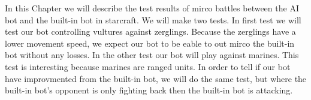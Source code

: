 In this Chapter we will describe the test results of mirco battles between the AI bot and the built-in bot in starcraft. We will make two tests. 
In first test we will test our bot controlling vultures against zerglings. Because the zerglings have a lower movement speed, we expect our bot
to be eable to out mirco the built-in bot without any losses. In the other test our bot will play against marines. This test is interesting because
marines are ranged units. In order to tell if our bot have improvmented from the built-in bot, we will do the same test, but where the built-in
bot's opponent is only fighting back then the built-in bot is attacking.